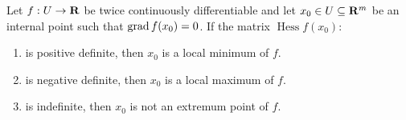 \begin{theorem}
    \label{thm:classification-critical-points}
    Let \(f: U \to \mathbf{R}\) be twice continuously differentiable and let \(x_0 \in U \subseteq
    \mathbf{R}^m\) be an internal point such that \(\operatorname{grad} f(x_0) = 0\). If
    the matrix \(\operatorname{Hess} f(x_0)\):
    \begin{enumerate}\setlength\itemsep{0em}
        \item is positive definite, then \(x_0\) is a local
              minimum of \(f\).
        \item is negative definite, then \(x_{0}\) is a local
              maximum of \(f\).
        \item is indefinite, then \(x_0\) is not an extremum point of \(f\).
    \end{enumerate}
\end{theorem}

